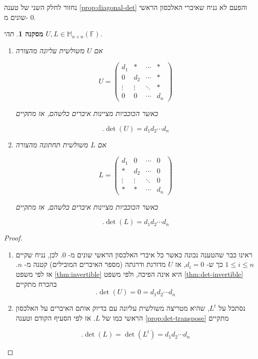 \documentclass[12pt]{report}
\theoremstyle{plain}
\newtheorem{corollary}[theorem]{מסקנה}
\theoremstyle{definition}
\newcommand{\F}{\mathbb{F}}
\newcommand{\M}{\mathbb{M}}
\newcommand{\0}{\mathbf{0}}
\begin{document}
נחזור לחלק השני של טענה
\ref{prop:diagonal-det}
והפעם לא נניח שאיברי האלכסון הראשי שונים מ-
$0$.

\begin{corollary}
תהי
$U,L\in\M_{n\times n}(\F)$.

\begin{enumerate}[label=\alph*.]
\item
אם
$U$
משולשית עליונה מהצורה

$$
U=\begin{pmatrix}
d_1 &* & \cdots & * \\
0 & d_2 & \cdots & * \\
\vdots & \vdots & \ddots & * \\
0 & 0 & \cdots & d_n
\end{pmatrix}
$$

כאשר הכוכביות מציינות איברים כלשהם,
אז מתקיים

$$
.\det(U)=d_1d_2\cdots d_n
$$

\item 
אם
$L$
משולשית תחתונה מהצורה

$$
L=\begin{pmatrix}
d_1 &0 & \cdots & 0 \\
* & d_2 & \cdots & 0 \\
\vdots & \vdots & \ddots & 0 \\
* & * & \cdots & d_n
\end{pmatrix}
$$

כאשר הכוכביות מציינות איברים כלשהם,
אז מתקיים

$$
.\det(L)=d_1d_2\cdots d_n
$$


\end{enumerate}
\end{corollary}

\begin{proof}\
\begin{enumerate}[label=\alph*.]
\item
ראינו כבר שהטענה נכונה כאשר כל איברי האלכסון הראשי שונים מ-
$0$.
לכן, נניח שקיים 
$1\leq i\leq n$
כך ש-
$d_i=0$,
אז
$U$
מדורגת ודרגתה (מספר האיברים המובילים) קטנה מ-
$n$. 
אז לפי משפט
\ref{thm:invertible}
היא אינה הפיכה, ולפי משפט
\ref{thm:det-invertible}
בהכרח מתקיים
$$
.\det(U)=0=d_1d_2\cdots d_n
$$


\item 
נסתכל על 
$L^t$,
שהיא מטריצה משולשית עליונה עם בדיוק אותם האיברים על האלכסון הראשי כמו של 
$L$. 
אז לפי הסעיף הקודם וטענה
\ref{prop:det-transpose}
מתקיים

$$
.\det(L)=\det(L^t)=d_1d_2\cdots d_n
$$


\end{enumerate}
\end{proof}
\end{document}
